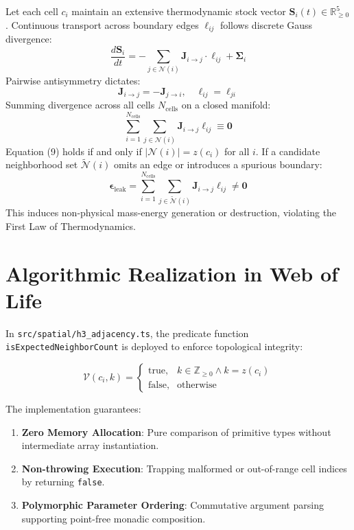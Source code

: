 \documentclass[10pt,twocolumn,letterpaper]{article}
\begin{document}
Let each cell $c_i$ maintain an extensive thermodynamic stock vector $\mathbf{S}_i(t) \in \mathbb{R}^5_{\ge 0}$. Continuous transport across boundary edges $\ell_{ij}$ follows discrete Gauss divergence:
\begin{equation}
  \frac{d \mathbf{S}_i}{dt} = -\sum_{j \in \mathcal{N}(i)} \mathbf{J}_{i \to j} \cdot \ell_{ij} + \mathbf{\Sigma}_i
\end{equation}
Pairwise antisymmetry dictates:
\begin{equation}
  \mathbf{J}_{i \to j} = -\mathbf{J}_{j \to i}, \quad \ell_{ij} = \ell_{ji}
\end{equation}
Summing divergence across all cells $N_{\text{cells}}$ on a closed manifold:
\begin{equation}
  \sum_{i=1}^{N_{\text{cells}}} \sum_{j \in \mathcal{N}(i)} \mathbf{J}_{i \to j} \ell_{ij} \equiv \mathbf{0}
\end{equation}
Equation (9) holds if and only if $|\mathcal{N}(i)| = z(c_i)$ for all $i$. If a candidate neighborhood set $\tilde{\mathcal{N}}(i)$ omits an edge or introduces a spurious boundary:
\begin{equation}
  \mathbf{\epsilon}_{\text{leak}} = \sum_{i=1}^{N_{\text{cells}}} \sum_{j \in \tilde{\mathcal{N}}(i)} \mathbf{J}_{i \to j} \ell_{ij} \neq \mathbf{0}
\end{equation}
This induces non-physical mass-energy generation or destruction, violating the First Law of Thermodynamics.

\section{Algorithmic Realization in Web of Life}

In \texttt{src/spatial/h3\_adjacency.ts}, the predicate function \texttt{isExpectedNeighborCount} is deployed to enforce topological integrity:

\begin{equation}
  \mathcal{V}(c_i, k) = 
  \begin{cases}
    \text{true}, & k \in \mathbb{Z}_{\ge 0} \land k = z(c_i) \\
    \text{false}, & \text{otherwise}
  \end{cases}
\end{equation}

The implementation guarantees:
\begin{enumerate}
  \item \textbf{Zero Memory Allocation}: Pure comparison of primitive types without intermediate array instantiation.
  \item \textbf{Non-throwing Execution}: Trapping malformed or out-of-range cell indices by returning \texttt{false}.
  \item \textbf{Polymorphic Parameter Ordering}: Commutative argument parsing supporting point-free monadic composition.
\end{enumerate}
\end{document}
